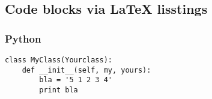 \subsection{Code blocks via LaTeX lisstings}

\subsubsection{Python}

\begin{lstlisting}
class MyClass(Yourclass):
    def __init__(self, my, yours):
        bla = '5 1 2 3 4'
        print bla
\end{lstlisting}

